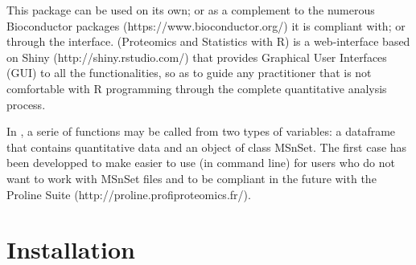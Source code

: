 \documentclass[12pt]{article}
\begin{document}
This package can be used on its own; or as a complement to the numerous 
Bioconductor packages (https://www.bioconductor.org/) it is compliant with; 
or through the  interface.
 (Proteomics and Statistics with R) is a web-interface based 
on Shiny (http://shiny.rstudio.com/) that provides Graphical User Interfaces 
(GUI) to all the  functionalities, so as to guide any 
practitioner that is not comfortable with R programming through the complete 
quantitative analysis process.


In , a serie of functions may be called from two types of variables: a 
dataframe that contains quantitative data and an object of class MSnSet. The 
first case has been developped to make  easier to use (in command line) 
for users who do not want to work with MSnSet files and to be compliant in 
the future with the Proline Suite (http://proline.profiproteomics.fr/).


\section{Installation}\label{sec:install}
\end{document}
